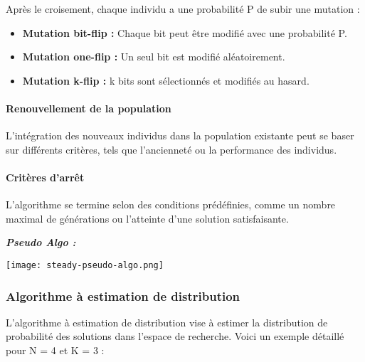 \documentclass{article}
\begin{document}
Après le croisement, chaque individu a une probabilité P de subir une mutation :

\begin{itemize}
    \item \textbf{Mutation bit-flip :} Chaque bit peut être modifié avec une probabilité P.
    \item \textbf{Mutation one-flip :} Un seul bit est modifié aléatoirement.
    \item \textbf{Mutation k-flip :} k bits sont sélectionnés et modifiés au hasard.
\end{itemize}

\paragraph{Renouvellement de la population}

L'intégration des nouveaux individus dans la population existante peut se baser sur différents critères, tels que l'ancienneté ou la performance des individus.

\paragraph{Critères d'arrêt}

L'algorithme se termine selon des conditions prédéfinies, comme un nombre maximal de générations ou l'atteinte d'une solution satisfaisante.


\textit{\textbf{Pseudo Algo :}}

\texttt{[image: steady-pseudo-algo.png]}

\subsubsection{Algorithme à estimation de distribution}
L'algorithme à estimation de distribution vise à estimer la distribution de probabilité des solutions dans l'espace de recherche. Voici un exemple détaillé pour N = 4 et K = 3 :
\end{document}
